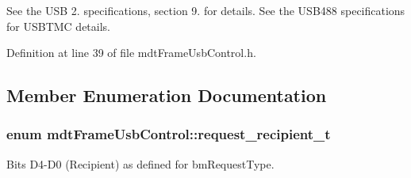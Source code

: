 See the U\-S\-B 2. specifications, section 9. for details. See the U\-S\-B488 specifications for U\-S\-B\-T\-M\-C details. 

Definition at line 39 of file mdt\-Frame\-Usb\-Control.\-h.



\subsection{Member Enumeration Documentation}
\hypertarget{classmdt_frame_usb_control_aaf1f08b1b5e47ab18426800ed0accbde}{
\subsubsection[{request\-\_\-recipient\-\_\-t}]{\setlength{\rightskip}{0pt plus 5cm}enum {\bf mdt\-Frame\-Usb\-Control\-::request\-\_\-recipient\-\_\-t}}}\label{classmdt_frame_usb_control_aaf1f08b1b5e47ab18426800ed0accbde}


Bits D4-\/\-D0 (Recipient) as defined for bm\-Request\-Type. 

